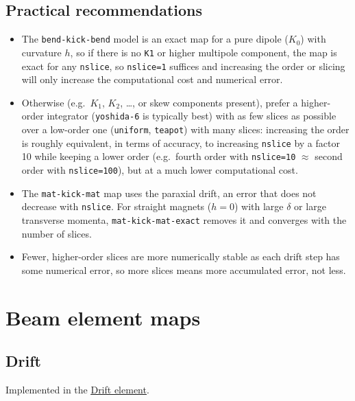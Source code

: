 \subsection{Practical recommendations}

\begin{itemize}
\item The \texttt{bend-kick-bend} model is an exact map for a pure dipole ($K_0$)
    with curvature $h$, so if there is no \texttt{K1} or higher multipole component,
    the map is exact for any \texttt{nslice}, so \texttt{nslice=1} suffices and
    increasing the order or slicing will only increase the computational cost and
    numerical error.
\item Otherwise (e.g.\ $K_1$, $K_2$, \dots, or skew components present),
    prefer a higher-order integrator (\texttt{yoshida-6} is typically best)
    with as few slices as possible over a low-order one
    (\texttt{uniform}, \texttt{teapot}) with many slices: increasing the
    order is roughly equivalent, in terms of accuracy, to increasing
    \texttt{nslice} by a factor 10 while keeping a lower order (e.g.\
    fourth order with \texttt{nslice=10} $\approx$ second order with
    \texttt{nslice=100}), but at a much lower computational cost.
\item The \texttt{mat-kick-mat} map uses the paraxial drift, an error that does
    not decrease with \texttt{nslice}. For straight magnets ($h=0$) with large
    $\delta$ or large transverse momenta, \texttt{mat-kick-mat-exact} removes
    it and converges with the number of slices.
\item Fewer, higher-order slices are more numerically stable as each
    drift step has some numerical error, so more slices means more
    accumulated error, not less.
\end{itemize}

\FloatBarrier



\section{Beam element maps}

\subsection{Drift}

Implemented in the \href{https://xsuite.readthedocs.io/en/latest/apireference.html#drift}{\underline{Drift element}}.
~\\

